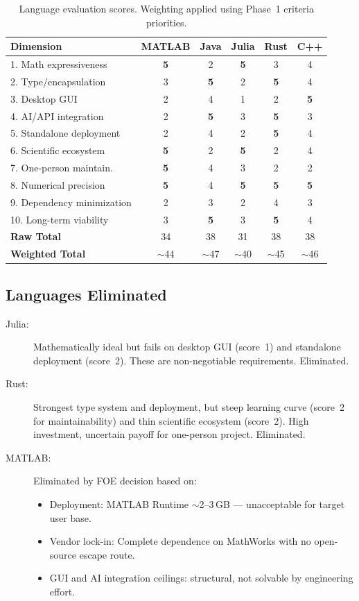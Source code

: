 \documentclass[11pt,a4paper]{article}
\begin{document}
\begin{table}[h]
\centering
\begin{tabular}{lccccc}
\toprule
\textbf{Dimension} & \textbf{MATLAB} & \textbf{Java} & \textbf{Julia} & \textbf{Rust} & \textbf{C++} \\
\midrule
1. Math expressiveness     & \textbf{5} & 2 & \textbf{5} & 3 & 4 \\
2. Type/encapsulation      & 3 & \textbf{5} & 2 & \textbf{5} & 4 \\
3. Desktop GUI             & 2 & 4 & 1 & 2 & \textbf{5} \\
4. AI/API integration      & 2 & \textbf{5} & 3 & \textbf{5} & 3 \\
5. Standalone deployment   & 2 & 4 & 2 & \textbf{5} & 4 \\
6. Scientific ecosystem    & \textbf{5} & 2 & \textbf{5} & 2 & 4 \\
7. One-person maintain.    & \textbf{5} & 4 & 3 & 2 & 2 \\
8. Numerical precision     & \textbf{5} & 4 & \textbf{5} & \textbf{5} & \textbf{5} \\
9. Dependency minimization & 2 & 3 & 2 & 4 & 3 \\
10. Long-term viability    & 3 & \textbf{5} & 3 & \textbf{5} & 4 \\
\midrule
\textbf{Raw Total}         & 34 & 38 & 31 & 38 & 38 \\
\textbf{Weighted Total}    & $\sim$44 & $\sim$47 & $\sim$40 & $\sim$45 & $\sim$46 \\
\bottomrule
\end{tabular}
\caption{Language evaluation scores. Weighting applied using Phase~1 criteria priorities.}
\end{table}

\subsection{Languages Eliminated}

\begin{description}
    \item[Julia:] Mathematically ideal but fails on desktop GUI (score~1) and standalone deployment (score~2). These are non-negotiable requirements. Eliminated.
    \item[Rust:] Strongest type system and deployment, but steep learning curve (score~2 for maintainability) and thin scientific ecosystem (score~2). High investment, uncertain payoff for one-person project. Eliminated.
    \item[MATLAB:] Eliminated by FOE decision based on:
    \begin{itemize}
        \item Deployment: MATLAB Runtime $\sim$2--3\,GB --- unacceptable for target user base.
        \item Vendor lock-in: Complete dependence on MathWorks with no open-source escape route.
        \item GUI and AI integration ceilings: structural, not solvable by engineering effort.
    \end{itemize}
\end{description}
\end{document}
